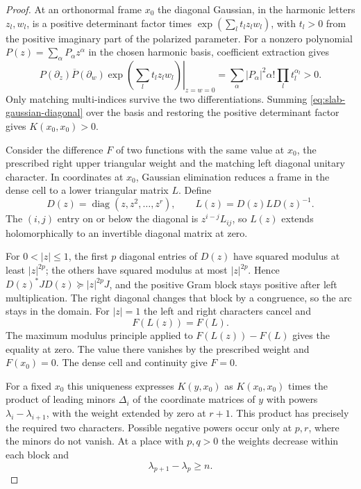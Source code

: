 \begin{proof}
At an orthonormal frame \(x_0\) the
diagonal Gaussian, in the harmonic letters \(z_l,w_l\),
is a positive determinant factor times
\(\exp(\sum_l t_l z_l w_l)\), with \(t_l>0\) from the
positive imaginary part of the polarized parameter.
For a nonzero polynomial \(P(z)=\sum_\alpha P_\alpha z^\alpha\)
in the chosen harmonic basis, coefficient extraction gives
\begin{equation}\label{eq:slab-gaussian-diagonal}
 \left.P(\partial_z)\overline P(\partial_w)
       \exp\!\left(\sum_l t_l z_l w_l\right)\right|_{z=w=0}
      =\sum_\alpha |P_\alpha|^2\alpha!\prod_l t_l^{\alpha_l}>0 .
\end{equation}
Only matching multi-indices survive the two differentiations.
Summing \eqref{eq:slab-gaussian-diagonal} over the basis and restoring the positive determinant
factor gives \(K(x_0,x_0)>0\).

Consider the difference \(F\) of two functions with the same
value at \(x_0\), the prescribed right upper triangular weight
and the matching left diagonal unitary character. In coordinates
at \(x_0\), Gaussian elimination reduces a frame in the dense
cell to a lower triangular matrix \(L\). Define
\[
 D(z)=\operatorname{diag}(z,z^2,\ldots,z^r),
 \qquad L(z)=D(z)LD(z)^{-1}.
\]
The \((i,j)\) entry on or below the diagonal is \(z^{i-j}L_{ij}\),
so \(L(z)\) extends holomorphically to an invertible diagonal
matrix at zero.

For \(0<|z|\le1\), the first \(p\) diagonal entries
of \(D(z)\) have squared modulus at least \(|z|^{2p}\);
the others have squared modulus at most \(|z|^{2p}\).
Hence \(D(z)^*JD(z)\succeq |z|^{2p}J\), and the positive
Gram block stays positive after left multiplication. The
right diagonal changes that block by a congruence, so the
arc stays in the domain. For \(|z|=1\) the left and right
characters cancel and
\[
 F(L(z))=F(L).
\]
The maximum modulus
principle applied to \(F(L(z))-F(L)\) gives the equality at
zero. The value there vanishes by the prescribed weight and
\(F(x_0)=0\). The dense cell and continuity give \(F=0\).

For a fixed \(x_0\) this uniqueness expresses \(K(y,x_0)\)
as \(K(x_0,x_0)\) times the product of leading minors
\(\Delta_i\) of the coordinate matrices of \(y\) with
powers \(\lambda_i-\lambda_{i+1}\), with the weight
extended by zero at \(r+1\). This product has precisely
the required two characters. Possible negative powers
occur only at \(p,r\), where the minors do not vanish.
At a place with \(p,q>0\) the weights decrease within
each block and
\[
 \lambda_{p+1}-\lambda_p\ge n.
\]


\end{proof}
